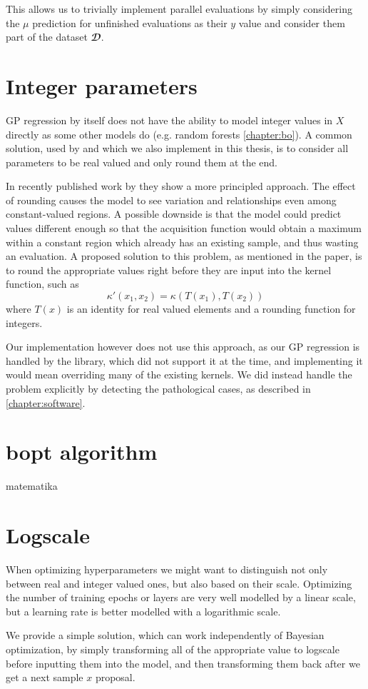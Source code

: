 This allows us to trivially implement parallel evaluations by simply
considering the $μ$ prediction for unfinished evaluations as their $y$ value
and consider them part of the dataset $𝓓$.


\section{Integer parameters}

GP regression by itself does not have the ability to model integer values in $X$ directly as some other models do (e.g. random forests \autoref{chapter:bo}). A common solution, used by \citep{spearmint} and which we also implement in this thesis, is to consider all parameters to be real valued and only round them at the end.

In recently published work by \cite{integer-valued-gp} they show a more principled approach. The effect of rounding causes the model to see variation and relationships even among constant-valued regions. A possible downside is that the model could predict values different enough so that the acquisition function would obtain a maximum within a constant region which already has an existing sample, and thus wasting an evaluation. A proposed solution to this problem, as mentioned in the paper, is to round the appropriate values right before they are input into the kernel function, such as
$$\kappa'(x_1, x_2) = \kappa(T(x_1), T(x_2))$$ where $T(x)$ is an identity for real valued elements and a rounding function for integers.

Our implementation however does not use this approach, as our GP regression is handled by the \cite{gpy2014} library, which did not support it at the time, and implementing it would mean overriding many of the existing kernels. We did instead handle the problem explicitly by detecting the pathological cases, as described in \autoref{chapter:software}.


\section{bopt algorithm}
\label{section:bopt-alg}

matematika

\section{Logscale}

When optimizing hyperparameters we might want to distinguish not only between real and integer valued ones, but also based on their scale. Optimizing the number of training epochs or layers are very well modelled by a linear scale, but a learning rate is better modelled with a logarithmic scale.

We provide a simple solution, which can work independently of Bayesian optimization, by simply transforming all of the appropriate value to logscale before inputting them into the model, and then transforming them back after we get a next sample $x$ proposal.

